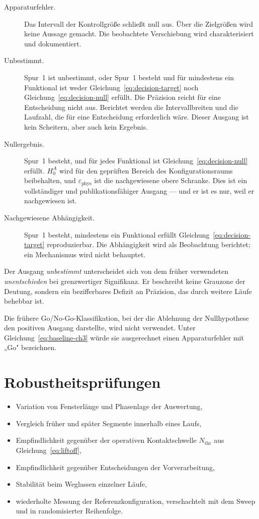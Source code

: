 \documentclass[12pt,a4paper]{report}
\begin{document}
\begin{description}
  \item[Apparaturfehler.] Das Intervall der Kontrollgröße schließt null
        aus. Über die Zielgrößen wird keine Aussage gemacht. Die
        beobachtete Verschiebung wird charakterisiert und dokumentiert.
  \item[Unbestimmt.] Spur~1 ist unbestimmt, oder Spur~1 besteht und für
        mindestens ein Funktional ist weder
        Gleichung~\eqref{eq:decision-target} noch
        Gleichung~\eqref{eq:decision-null} erfüllt. Die Präzision reicht
        für eine Entscheidung nicht aus. Berichtet werden die
        Intervallbreiten und die Laufzahl, die für eine Entscheidung
        erforderlich wäre. Dieser Ausgang ist kein Scheitern, aber auch
        kein Ergebnis.
  \item[Nullergebnis.] Spur~1 besteht, und für jedes Funktional ist
        Gleichung~\eqref{eq:decision-null} erfüllt. $H_{0}^{A}$ wird für
        den geprüften Bereich des Konfigurationsraums beibehalten, und
        $\varepsilon_{\mathrm{phys}}$ ist die nachgewiesene obere
        Schranke. Dies ist ein vollständiger und publikationsfähiger
        Ausgang --- und er ist es nur, weil er nachgewiesen ist.
  \item[Nachgewiesene Abhängigkeit.] Spur~1 besteht, mindestens ein
        Funktional erfüllt Gleichung~\eqref{eq:decision-target}
        reproduzierbar. Die Abhängigkeit wird als Beobachtung berichtet;
        ein Mechanismus wird nicht behauptet.
\end{description}

Der Ausgang \emph{unbestimmt} unterscheidet sich von dem früher
verwendeten \emph{unentschieden} bei grenzwertiger Signifikanz. Er
beschreibt keine Grauzone der Deutung, sondern ein bezifferbares
Defizit an Präzision, das durch weitere Läufe behebbar ist.

Die frühere Go/No-Go-Klassifikation, bei der die Ablehnung der
Nullhypothese den positiven Ausgang darstellte, wird nicht verwendet.
Unter Gleichung~\eqref{eq:baseline-ch3} würde sie ausgerechnet einen
Apparaturfehler mit „Go" bezeichnen.

\section{Robustheitsprüfungen}

\begin{itemize}
  \item Variation von Fensterlänge und Phasenlage der Auswertung,
  \item Vergleich früher und später Segmente innerhalb eines Laufs,
  \item Empfindlichkeit gegenüber der operativen Kontaktschwelle
        $N_{\mathrm{thr}}$ aus Gleichung~\eqref{eq:liftoff},
  \item Empfindlichkeit gegenüber Entscheidungen der Vorverarbeitung,
  \item Stabilität beim Weglassen einzelner Läufe,
  \item wiederholte Messung der Referenzkonfiguration, verschachtelt mit
        dem Sweep und in randomisierter Reihenfolge.
\end{itemize}
\end{document}
